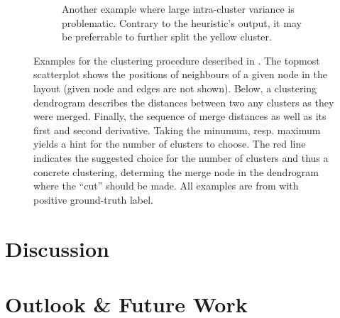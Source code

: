 \documentclass[
	fontsize=10pt, %
	twoside=false, %
	secnumdepth=1, %
  toc=indentunnumbered %
]{kaobook}
\begin{document}
\begin{figure}[h]
\begin{subfigure}{0.48\linewidth}
        \caption{Another example where large intra-cluster variance is
          problematic. Contrary to the heuristic's output, it may be preferrable
          to further split the yellow cluster.}
      \end{subfigure}
      \caption[
      Example outputs of the heuristic for attaching edges after node
      duplication has been decided.
      ]
      {
    Examples for the clustering procedure described in . The topmost scatterplot shows the positions of neighbours
    of a given node in the layout (given node and edges are not shown). Below, a clustering dendrogram describes
    the distances between two any clusters as they were merged. Finally, the
    sequence of merge distances as well as its first and second derivative.
    Taking the minumum, resp. maximum yields a hint for the number of clusters
    to choose. The red line indicates the suggested choice for the number of
    clusters and thus a concrete clustering, determing the merge node in the
    dendrogram where the ``cut'' should be made.
    All examples are from \ADLast with positive ground-truth label.}
  \label{fig:neighb-clust-examples}
\end{figure}


\chapter{Discussion}
\label{sec:discussion}





\chapter{Outlook \& Future Work}
\label{sec:future-work}




\end{document}
